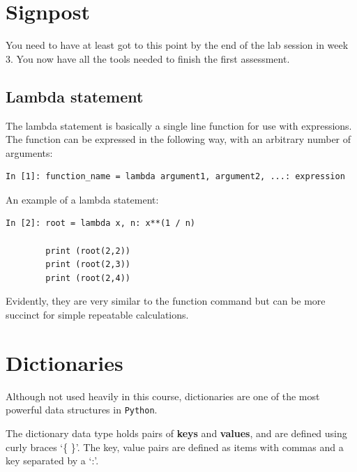 \section{Signpost} 

You need to have at least got to this point by the end of the lab session in week 3. You now have all the tools needed to finish the first assessment.

\begin{tcolorbox}[colback=red!5!white,colframe=red!75!black]
\section{Lambda statement}
The lambda statement is basically a single line function for use with expressions. The function can be expressed in the following way, with an arbitrary number of arguments:
\begin{lstlisting}[style=PY]
In [1]: function_name = lambda argument1, argument2, ...: expression
\end{lstlisting}
An example of a lambda statement:
\begin{lstlisting}[style=PY]
In [2]: root = lambda x, n: x**(1 / n)

        print (root(2,2))
        print (root(2,3))
        print (root(2,4))
\end{lstlisting}
Evidently, they are very similar to the function command but can be more succinct for simple repeatable calculations.
\end{tcolorbox}

\section{Dictionaries}
Although not used heavily in this course, dictionaries are one of the most powerful data structures in \texttt{Python}.

\noindent The dictionary data type holds pairs of {\bf keys} and {\bf values}, and are defined using curly braces `\{ \}'. The key, value pairs are defined as items with commas and a key separated by a `:'.\\


